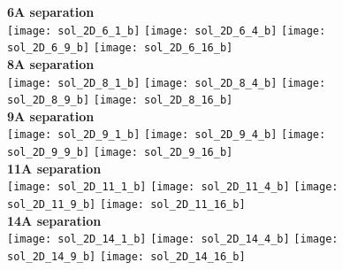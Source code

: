 \documentclass[journal=acsnano,manuscript=article]{achemso}
\begin{document}
\begin{figure}[h!]
	\centering
	\textbf{6A separation} \\
	\texttt{[image: sol\_2D\_6\_1\_b]}
	\texttt{[image: sol\_2D\_6\_4\_b]}
	\texttt{[image: sol\_2D\_6\_9\_b]}
	\texttt{[image: sol\_2D\_6\_16\_b]}
	\\ \textbf{8A separation} \\
	\texttt{[image: sol\_2D\_8\_1\_b]}
	\texttt{[image: sol\_2D\_8\_4\_b]}
	\texttt{[image: sol\_2D\_8\_9\_b]}
	\texttt{[image: sol\_2D\_8\_16\_b]}
	\\ \textbf{9A separation} \\
	\texttt{[image: sol\_2D\_9\_1\_b]}
	\texttt{[image: sol\_2D\_9\_4\_b]}
	\texttt{[image: sol\_2D\_9\_9\_b]}
	\texttt{[image: sol\_2D\_9\_16\_b]}
	\\ \textbf{11A separation} \\
	\texttt{[image: sol\_2D\_11\_1\_b]}
	\texttt{[image: sol\_2D\_11\_4\_b]}
	\texttt{[image: sol\_2D\_11\_9\_b]}
	\texttt{[image: sol\_2D\_11\_16\_b]}
	\\ \textbf{14A separation} \\
	\texttt{[image: sol\_2D\_14\_1\_b]}
	\texttt{[image: sol\_2D\_14\_4\_b]}
	\texttt{[image: sol\_2D\_14\_9\_b]}
	\texttt{[image: sol\_2D\_14\_16\_b]}
	\label{fig:neigh_sol}
\end{figure}
\end{document}
